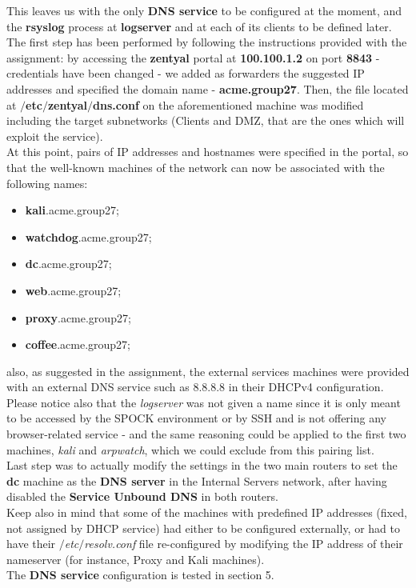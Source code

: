 This leaves us with the only \textbf{DNS service} to be configured at the moment, and the \textbf{rsyslog} process at \textbf{logserver} and at each of its clients to be defined later. The first step has been performed by following the instructions provided with the assignment: by accessing the \textbf{zentyal} portal at \textbf{100.100.1.2} on port \textbf{8843} - credentials have been changed - we added as forwarders the suggested IP addresses and specified the domain name - \textbf{acme.group27}. Then, the file located at \textbf{$/$etc$/$zentyal$/$dns.conf} on the aforementioned machine was modified including the target subnetworks (Clients and DMZ, that are the ones which will exploit the service).\\
At this point, pairs of IP addresses and hostnames were specified in the portal, so that the well-known machines of the network can now be associated with the following names:\\
\begin{itemize}
\item \textbf{kali}.acme.group27;
\item \textbf{watchdog}.acme.group27;
\item \textbf{dc}.acme.group27;
\item \textbf{web}.acme.group27;
\item \textbf{proxy}.acme.group27;
\item \textbf{coffee}.acme.group27;
\end{itemize}

also, as suggested in the assignment, the external services machines were provided with an external DNS service such as 8.8.8.8 in their DHCPv4 configuration. Please notice also that the \textit{logserver} was not given a name since it is only meant to be accessed by the SPOCK environment or by SSH and is not offering any browser-related service - and the same reasoning could be applied to the first two machines, \textit{kali} and \textit{arpwatch}, which we could exclude from this pairing list.\\
Last step was to actually modify the  settings in the two main routers to set the \textbf{dc} machine as the \textbf{DNS server} in the Internal Servers network, after having disabled the \textbf{Service Unbound DNS} in both routers.\\
Keep also in mind that some of the machines with predefined IP addresses (fixed, not assigned by DHCP service) had either to be configured externally, or had to have their \textit{$/$etc$/$resolv.conf} file re-configured by modifying the IP address of their nameserver (for instance, Proxy and Kali machines).\\
The \textbf{DNS service} configuration is tested in section 5.

